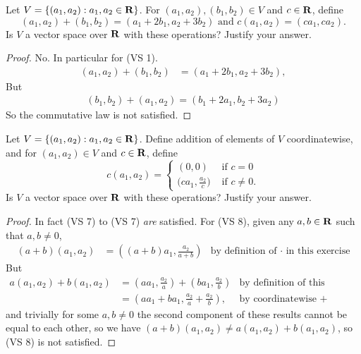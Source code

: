 \begin{exercise} \label{exercise 1.2.18}
Let \(V = \{(a_1, a_2) : a_1, a_2 \in \mathbf{R}\}\).
For \((a_1, a_2), (b_1, b_2) \in V\) and \(c \in \mathbf{R}\), define
\[
    (a_1, a_2) + (b_1, b_2) = (a_1 + 2b_1, a_2 + 3b_2) \text{ and } c(a_1, a_2) = (ca_1, ca_2).
\]
Is \(V\) a vector space over \(\mathbf{R}\) with these operations?
Justify your answer.
\end{exercise}

\begin{proof}
No.
In particular for (VS 1).
\begin{align*}
    (a_1, a_2) + (b_1, b_2) & = (a_1 + 2b_1, a_2 + 3b_2),
\end{align*}
But
\begin{align*}
    (b_1, b_2) + (a_1, a_2) = (b_1 + 2a_1, b_2 + 3a_2)
\end{align*}
So the commutative law is not satisfied.
\end{proof}

\begin{exercise} \label{exercise 1.2.19}
Let \(V = \{(a_1, a_2 ) : a_1, a_2 \in \mathbf{R}\}\).
Define addition of elements of \(V\) coordinatewise, and for \((a_1, a_2) \in V\) and \(c \in \mathbf{R}\), define
\begin{equation*}
    c(a_1, a_2) =
    \begin{cases}
        (0, 0) & \text{ if } c = 0 \\
        \Big(c a_1, \frac{a_2}{c}\Big) & \text{ if } c \ne 0.
    \end{cases}
\end{equation*}
Is \(V\) a vector space over \(\mathbf{R}\) with these operations?
Justify your answer.
\end{exercise}

\begin{proof}
In fact  (VS 7) to (VS 7) \emph{are} satisfied.
For (VS 8), given any \(a, b \in \mathbf{R}\) such that \(a, b \ne 0\),
\begin{align*}
    (a + b)(a_1, a_2) & = ((a + b)a_1, \frac{a_2}{a + b}) & \text{by definition of \(\cdot\) in this exercise}
\end{align*}
But
\begin{align*}
    a(a_1, a_2) + b(a_1, a_2) & = (a a_1, \frac{a_2}{a}) + (b a_1, \frac{a_2}{b}) & \text{by definition of this exercise} \\
                              & = (a a_1 + b a_1, \frac{a_2}{a} + \frac{a_2}{b}), & \text{by coordinatewise \(+\)}
\end{align*}
and trivially for some \(a, b \ne 0\) the second component of these results cannot be equal to each other,
so we have \((a + b)(a_1, a_2) \ne a(a_1, a_2) + b(a_1, a_2)\), so (VS 8) is not satisfied.
\end{proof}

